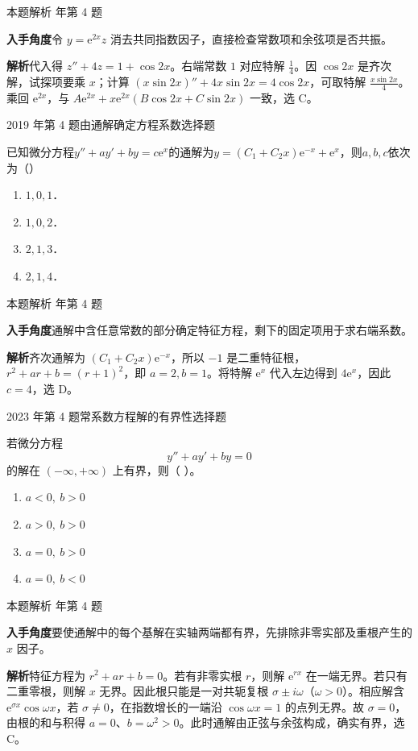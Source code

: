 \documentclass[UTF8,zihao=-4,fontset=fandol]{ctexart}
\newcommand{\pickout}{\hfill（\hspace{1.4em}）}
\newenvironment{abcd}{\begin{enumerate}[label=\textup{(\Alph*)},leftmargin=2.3em,itemsep=1pt,topsep=4pt,parsep=1pt]}{\end{enumerate}}
\newcommand{\choices}[4]{%
  \begin{abcd}
    \item #1
    \item #2
    \item #3
    \item #4
  \end{abcd}}
\newcommand{\QuestionPage}[6]{%
  \par\noindent\begin{minipage}{\linewidth}
  \raggedright
  {\small\textcolor{black!60}{#3\quad #5}\hfill\textcolor{accent}{#2}}\par\smallskip}
\newcommand{\QuestionEnd}{\end{minipage}\par\medskip}
\newcommand{\QuestionPage}[6]{%
  \clearpage
  {\small\textcolor{accent}{#1\hfill #2}}\par\medskip
  {\small\textcolor{black!60}{#3\quad #5\hfill #6}}\par\vspace{9bp}}
\newcommand{\QuestionEnd}{}
\newenvironment{QuestionSolution}[1]{%
  \clearpage
  {\small\textcolor{black!60}{本题解析\quad #1}}\par\medskip
}{\par\clearpage}
\begin{document}
\begin{QuestionSolution}{2017 年第 4 题}
\textbf{入手角度}\quad 令 \(y=\mathrm{e}^{2x}z\) 消去共同指数因子，直接检查常数项和余弦项是否共振。

\textbf{解析}\quad 代入得 \(z''+4z=1+\cos2x\)。右端常数 \(1\) 对应特解 \(\frac{1}{4}\)。因 \(\cos2x\) 是齐次解，试探项要乘 \(x\)；计算 \((x\sin2x)''+4x\sin2x=4\cos2x\)，可取特解 \(\frac{x\sin2x}{4}\)。乘回 \(\mathrm{e}^{2x}\)，与 \(A\mathrm{e}^{2x}+x\mathrm{e}^{2x}(B\cos2x+C\sin2x)\) 一致，选 C。
\end{QuestionSolution}

\QuestionPage{4.2 高阶线性微分方程}{选择题}{2019 年第 4 题}{1}{由通解确定方程系数}{221 / 234}
已知微分方程$y'' + ay' + by = c\mathrm{e}^x$的通解为$y = (C_1 + C_2 x) \mathrm{e}^{- x} + \mathrm{e}^x$，则$a,b,c$依次为\pickout{}
\begin{abcd}
\item $1,0,1$．
\item $1,0,2$．
\item $2,1,3$．
\item $2,1,4$．
\end{abcd}
\QuestionEnd

\begin{QuestionSolution}{2019 年第 4 题}
\textbf{入手角度}\quad 通解中含任意常数的部分确定特征方程，剩下的固定项用于求右端系数。

\textbf{解析}\quad 齐次通解为 \((C_1+C_2x)\mathrm{e}^{-x}\)，所以 \(-1\) 是二重特征根，\(r^2+ar+b=(r+1)^2\)，即 \(a=2,b=1\)。将特解 \(\mathrm{e}^x\) 代入左边得到 \(4\mathrm{e}^x\)，因此 \(c=4\)，选 D。
\end{QuestionSolution}

\QuestionPage{4.2 高阶线性微分方程}{选择题}{2023 年第 4 题}{1}{常系数方程解的有界性}{222 / 234}
若微分方程
\[y''+ay'+by=0
\]
的解在 \((-\infty,+\infty)\) 上有界，则（ ）。
\choices{\(a<0,\ b>0\)}{\(a>0,\ b>0\)}{\(a=0,\ b>0\)}{\(a=0,\ b<0\)}
\QuestionEnd

\begin{QuestionSolution}{2023 年第 4 题}
\textbf{入手角度}\quad 要使通解中的每个基解在实轴两端都有界，先排除非零实部及重根产生的 \(x\) 因子。

\textbf{解析}\quad 特征方程为 \(r^2+ar+b=0\)。若有非零实根 \(r\)，则解 \(\mathrm{e}^{rx}\) 在一端无界。若只有二重零根，则解 \(x\) 无界。因此根只能是一对共轭复根 \(\sigma\pm i\omega\)（\(\omega>0\)）。相应解含 \(\mathrm{e}^{\sigma x}\cos\omega x\)，若 \(\sigma\ne0\)，在指数增长的一端沿 \(\cos\omega x=1\) 的点列无界。故 \(\sigma=0\)，由根的和与积得 \(a=0\)、\(b=\omega^2>0\)。此时通解由正弦与余弦构成，确实有界，选 C。
\end{QuestionSolution}
\end{document}
